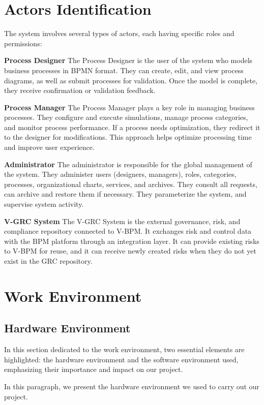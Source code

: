 \section{Actors Identification}

The system involves several types of actors, each having specific roles and permissions:

\textbf{Process Designer} The Process Designer is the user of the system who models business processes in BPMN format. They can create, edit, and view process diagrams, as well as submit processes for validation. Once the model is complete, they receive confirmation or validation feedback.

\textbf{Process Manager} The Process Manager plays a key role in managing business processes. They configure and execute simulations, manage process categories, and monitor process performance. If a process needs optimization, they redirect it to the designer for modifications. This approach helps optimize processing time and improve user experience.

\textbf{Administrator} The administrator is responsible for the global management of the system. They administer users (designers, managers), roles, categories, processes, organizational charts, services, and archives. They consult all requests, can archive and restore them if necessary. They parameterize the system, and supervise system activity.

\textbf{V-GRC System} The V-GRC System is the external governance, risk, and compliance repository connected to V-BPM. It exchanges risk and control data with the BPM platform through an integration layer. It can provide existing risks to V-BPM for reuse, and it can receive newly created risks when they do not yet exist in the GRC repository.

\section{Work Environment}

\subsection{Hardware Environment}

In this section dedicated to the work environment, two essential elements are highlighted: the hardware environment and the software environment used, emphasizing their importance and impact on our project.

In this paragraph, we present the hardware environment we used to carry out our project.

